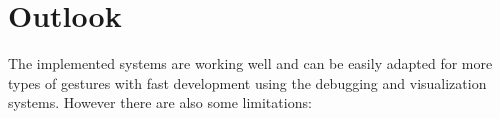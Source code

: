 \chapter{Outlook}

The implemented systems are working well and can be easily adapted for more types of gestures with fast development using the debugging and visualization systems. However there are also some limitations:
